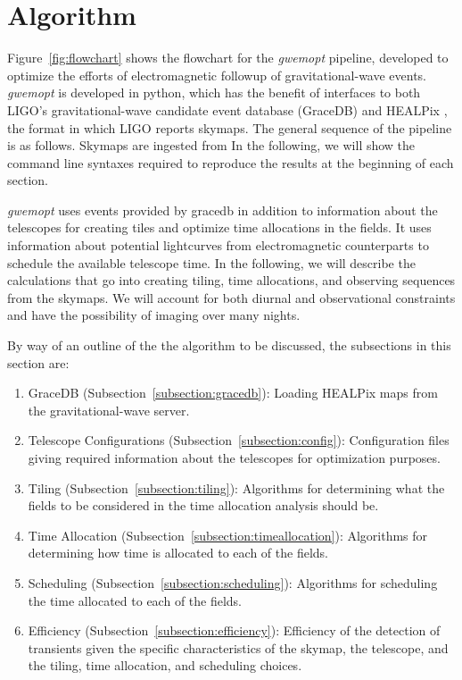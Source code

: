 \documentclass[twocolumn]{aastex62}
\begin{document}
\section{Algorithm}
\label{sec:algorithm}

Figure~\ref{fig:flowchart} shows the flowchart for the \emph{gwemopt} pipeline, developed to optimize the efforts of electromagnetic followup of gravitational-wave events.  \emph{gwemopt} is developed in python, which has the benefit of interfaces to both LIGO's gravitational-wave candidate event database (GraceDB) and HEALPix \citep{GoHi2005}, the format in which LIGO reports skymaps. The general sequence of the pipeline is as follows. Skymaps are ingested from 
In the following, we will show the command line syntaxes required to reproduce the results at the beginning of each section.

\emph{gwemopt} uses events provided by gracedb in addition to information about the telescopes for creating tiles and optimize time allocations in the fields.
It uses information about potential lightcurves from electromagnetic counterparts to schedule the available telescope time.
In the following, we will describe the calculations that go into creating tiling, time allocations, and observing sequences from the skymaps.
We will account for both diurnal and observational constraints and have the possibility of imaging over many nights.

By way of an outline of the the algorithm to be discussed, the subsections in this section are:
\begin{enumerate}
\item GraceDB (Subsection~\ref{subsection:gracedb}): Loading HEALPix maps from the gravitational-wave server.
\item Telescope Configurations (Subsection~\ref{subsection:config}): Configuration files giving required information about the telescopes for optimization purposes.
\item Tiling (Subsection~\ref{subsection:tiling}): Algorithms for determining what the fields to be considered in the time allocation analysis should be.
\item Time Allocation (Subsection~\ref{subsection:timeallocation}): Algorithms for determining how time is allocated to each of the fields.
\item Scheduling (Subsection~\ref{subsection:scheduling}): Algorithms for scheduling the time allocated to each of the fields.
\item Efficiency (Subsection~\ref{subsection:efficiency}): Efficiency of the detection of transients given the specific characteristics of the skymap, the telescope, and the tiling, time allocation, and scheduling choices.
\end{enumerate}
\end{document}
